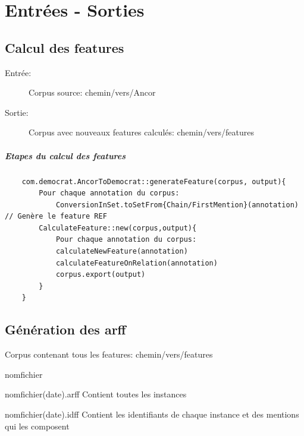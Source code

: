 \documentclass[a4paper,10pt]{report}
\begin{document}
  \chapter{Entrées - Sorties}
  \section{Calcul des features}

    \begin{description}
     \item [Entrée:] Corpus source: chemin/vers/Ancor
		    \begin{figure}[h!b]		      
		    \end{figure}
      \item[Sortie:] Corpus avec nouveaux features calculés: chemin/vers/features	
		    \begin{figure}[h!b]		      
		    \end{figure}
    \end{description}
    \paragraph{Etapes du calcul des features}
    \begin{verbatim}
	com.democrat.AncorToDemocrat::generateFeature(corpus, output){
	    Pour chaque annotation du corpus:
	        ConversionInSet.toSetFrom{Chain/FirstMention}(annotation) // Genère le feature REF
	    CalculateFeature::new(corpus,output){
	        Pour chaque annotation du corpus:
	        calculateNewFeature(annotation)
	        calculateFeatureOnRelation(annotation)
	        corpus.export(output)
	    }
	}
    \end{verbatim}

    

  \section{Génération des arff}
    \begin{description}
     \item [Entrée:] Corpus contenant tous les features: chemin/vers/features			    
     \item [Sortie:] nomfichier
	  \itemize
	    \item nomfichier(date).arff \textrightarrow  Contient toutes les instances
	    \item nomfichier(date).idff \textrightarrow  Contient les identifiants de chaque instance et des mentions qui les composent
    \end{description}
\end{document}
